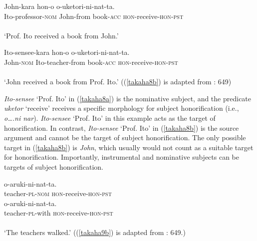 \documentclass[output=paper]{langscibook}
\begin{document}
\begin{exe}
\ex 
\begin{xlist}
\ex \label{takaha8a}
 {John-kara} {hon-o} {o-uketori-ni-nat-ta}.\\
Ito-professor-\textsc{nom} John-from book-\textsc{acc} \textsc{hon}-receive-\textsc{hon}-\textsc{pst}\\\\
`Prof. Ito received a book from John.’      

\ex \label{takaha8b}
 {Ito-sensee-kara} {hon-o} {o-uketori-ni-nat-ta}.\\
John-\textsc{nom} Ito-teacher-from book-\textsc{acc} \textsc{hon}-receive-\textsc{hon}-\textsc{pst}\\\\
`John received a book from Prof. Ito.’ ((\ref{takaha8b}) is adapted from \citealt{Kishimoto2010}: 649) 

\end{xlist}
\end{exe}

\emph{Ito-sensee} ‘Prof. Ito’ in (\ref{takaha8a}) is the nominative subject, and the predicate \emph{uketor} ‘receive’ receives a specific morphology for subject honorification (i.e., \emph{o….ni nar}). \emph{Ito-sensee} ‘Prof. Ito’ in this example acts as the target of honorification. In contrast, \emph{Ito-sensee} ‘Prof. Ito’ in (\ref{takaha8b}) is the source argument and cannot be the target of subject honorification. The only possible target in (\ref{takaha8b}) is \emph{John}, which usually would not count as a suitable target for honorification. Importantly, instrumental and nominative subjects can be targets of subject honorification.

\begin{exe}
\ex 
\begin{xlist}
\ex \label{takaha9a}
 {o-aruki-ni-nat-ta}.\\
teacher-\textsc{pl}-\textsc{nom} \textsc{hon}-receive-\textsc{hon}-\textsc{pst}\\


\ex \label{takaha9b}
 {o-aruki-ni-nat-ta}.\\
teacher-\textsc{pl}-with \textsc{hon}-receive-\textsc{hon}-\textsc{pst}\\\\
`The teachers walked.' ((\ref{takaha9b}) is adapted from \citealt{Kishimoto2010}: 649.)
\end{xlist}
\end{exe}
\end{document}
